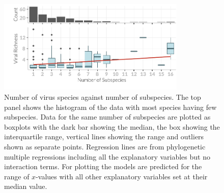 \begin{knitrout}\footnotesize
{}\color{fgcolor}\begin{figure}[t]

{\centering \includegraphics[width=0.8\textwidth]{figure/boxplot-1} 

}

\caption[Number of virus species against number of subspecies]{Number of virus species against number of subspecies. 		
The top panel shows the histogram of the data with most species having few subspecies.		
Data for the same number of subspecies are plotted as boxplots with the dark bar showing the median, the box showing the interquartile range, vertical lines showing the range and outliers shown as separate points.		
Regression lines are from phylogenetic multiple regressions including all the explanatory variables but no interaction terms.
For plotting the models are predicted for the range of $x$-values with all other explanatory variables set at their median value.			
}\label{fig:boxplot}
\end{figure}


\end{knitrout}



